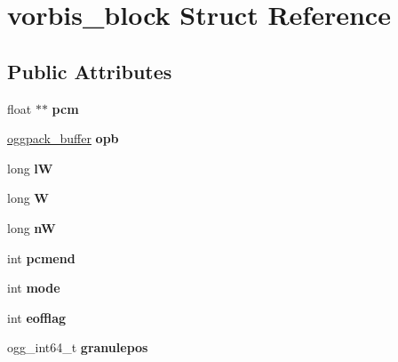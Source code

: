 \hypertarget{structvorbis__block}{
\section{vorbis\_\-block Struct Reference}
\label{structvorbis__block}
}
\subsection*{Public Attributes}
\begin{DoxyCompactItemize}
\item 
\hypertarget{structvorbis__block_ac8312d70a6e63afc01d3df8a54ac6508}{
float $\ast$$\ast$ {\bfseries pcm}}
\label{structvorbis__block_ac8312d70a6e63afc01d3df8a54ac6508}

\item 
\hypertarget{structvorbis__block_a43f1746974a729fa4e835ef995f9782a}{
\hyperlink{structoggpack__buffer}{oggpack\_\-buffer} {\bfseries opb}}
\label{structvorbis__block_a43f1746974a729fa4e835ef995f9782a}

\item 
\hypertarget{structvorbis__block_a97675088561ed9aa4559e869aafd1f2c}{
long {\bfseries lW}}
\label{structvorbis__block_a97675088561ed9aa4559e869aafd1f2c}

\item 
\hypertarget{structvorbis__block_a1e420440dd6a5a39262c0fe7afa8435a}{
long {\bfseries W}}
\label{structvorbis__block_a1e420440dd6a5a39262c0fe7afa8435a}

\item 
\hypertarget{structvorbis__block_a6fa002c8c36ad39c1c015cfa673dda28}{
long {\bfseries nW}}
\label{structvorbis__block_a6fa002c8c36ad39c1c015cfa673dda28}

\item 
\hypertarget{structvorbis__block_a946562a7fdb80cabf6ee749bdce1a0ed}{
int {\bfseries pcmend}}
\label{structvorbis__block_a946562a7fdb80cabf6ee749bdce1a0ed}

\item 
\hypertarget{structvorbis__block_adab44bb8520c9d5daafee3f1a1bcf538}{
int {\bfseries mode}}
\label{structvorbis__block_adab44bb8520c9d5daafee3f1a1bcf538}

\item 
\hypertarget{structvorbis__block_a7bc1252bc17a2cd1ee2a4154fdd2617b}{
int {\bfseries eofflag}}
\label{structvorbis__block_a7bc1252bc17a2cd1ee2a4154fdd2617b}

\item 
\hypertarget{structvorbis__block_a3dc7d5e474ae80ea641df91eba16b490}{
ogg\_\-int64\_\-t {\bfseries granulepos}}
\label{structvorbis__block_a3dc7d5e474ae80ea641df91eba16b490}


\end{DoxyCompactItemize}
